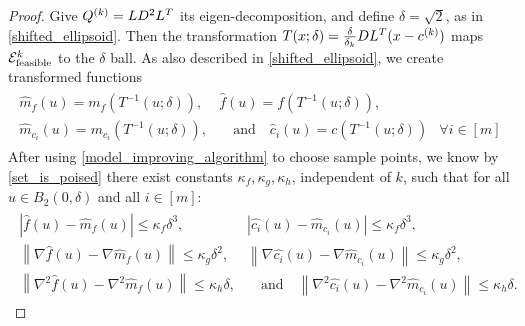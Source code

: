 \begin{proof}

Give ${Q^{(k)}} = LD^2L^T$ its eigen-decomposition, and define 
$\delta = \sqrt{2}$,
as in \cref{shifted_ellipsoid}.
Then the transformation $T(x; \delta) = \frac{\delta}{\delta_k} D L^T(x - c^{(k)})$ maps ${\mathcal E^k_{\textrm{feasible}}}$ to the $\delta$ ball.
As also described in \cref{shifted_ellipsoid}, we create transformed functions
\begin{align*}
\begin{array}{ccc}
\hat {m}_f(u) = m_f(T^{-1}(u; \delta)),&  \hat f (u) = f(T^{-1}(u; \delta)), &\\
\hat {m}_{c_i}(u) = m_{c_i}(T^{-1}(u; \delta)), &  \quad \textrm{and} \quad \hat c_i (u) = c(T^{-1}(u; \delta))& \forall i \in [m]
\end{array}
\end{align*}
After using \cref{model_improving_algorithm} to choose sample points, we know by \cref{set_is_poised} 
there exist constants $\kappa_f, \kappa_g, \kappa_h$, independent of $k$, such that for all $u \in B_2(0, \delta)$ and all $i \in [m]$:
\begin{align*}
\begin{array}{cc}
\left| \hat {f}\left(u\right) -  \hat{m}_f\left(u\right) \right|\le \kappa_f \delta^3, &
\left| \hat {{c_i}}\left(u\right) -  \hat{m}_{c_i}\left(u\right) \right|\le \kappa_f \delta^3, \\
\left\|\nabla \hat {f}\left(u\right) - \nabla \hat{m}_f\left(u\right) \right\|\le \kappa_g \delta^2, &
\left\|\nabla \hat {{c_i}}\left(u\right) - \nabla \hat{m}_{c_i}\left(u\right) \right\|\le \kappa_g \delta^2, \\
\left\|\nabla^2 \hat {f}\left(u\right) - \nabla^2 \hat{m}_f\left(u\right) \right\|\le \kappa_h \delta, &
\quad \textrm{and} \quad \left\|\nabla^2 \hat {{c_i}}\left(u\right) - \nabla^2 \hat{m}_{c_i}\left(u\right) \right\|\le \kappa_h \delta.
\end{array}
\end{align*}

\end{proof}
